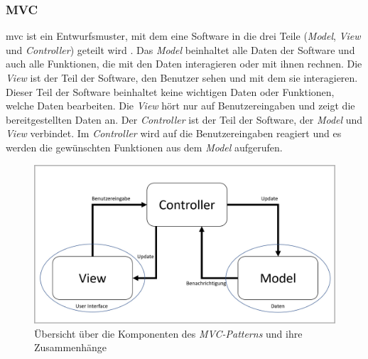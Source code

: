\subsubsection{MVC}
\Gls{mvc} ist ein Entwurfsmuster, mit dem eine Software in die drei Teile (\textit{Model}, \textit{View} und \textit{Controller}) geteilt wird \cite{mvc}. Das \textit{Model} beinhaltet alle Daten der Software und auch alle Funktionen, die mit den Daten interagieren oder mit ihnen rechnen. Die \textit{View} ist der Teil der Software, den Benutzer sehen und mit dem sie interagieren. Dieser Teil der Software beinhaltet keine wichtigen Daten oder Funktionen, welche Daten bearbeiten. Die \textit{View} hört nur auf Benutzereingaben und zeigt die bereitgestellten Daten an. Der \textit{Controller} ist der Teil der Software, der \textit{Model} und \textit{View} verbindet. Im \textit{Controller} wird auf die Benutzereingaben reagiert und es werden die gewünschten Funktionen aus dem \textit{Model} aufgerufen.
\begin{figure}[H]
	\centering
	\includegraphics[width=0.75\linewidth]{images/rfoster_study/mvc}
	\caption[Übersicht des \textit{MVC-Patterns}]{Übersicht über die Komponenten des \textit{MVC-Patterns} und ihre Zusammenhänge}
	\label{fig:mvc}
\end{figure}
